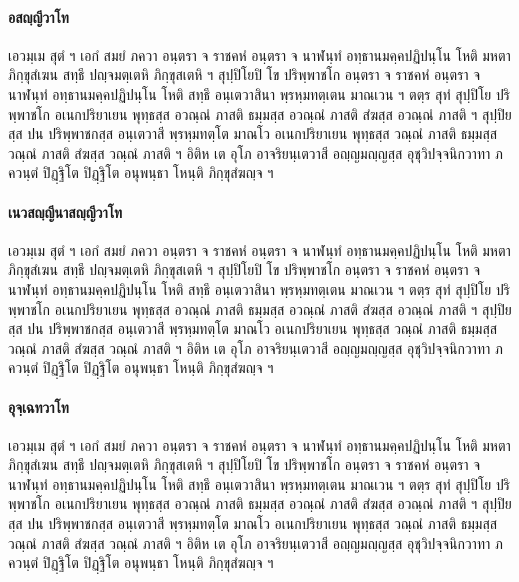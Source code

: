\documentclass[
]{book}
\begin{document}
\hypertarget{uxe2duxe2auxe0duxe3auxe0duxe35uxe27uxe32uxe42uxe17}{%
\paragraph{อสญฺญีวาโท}\label{uxe2duxe2auxe0duxe3auxe0duxe35uxe27uxe32uxe42uxe17}}

เอวมฺเม สุตํ ฯ เอกํ สมยํ ภควา อนฺตรา จ ราชคหํ อนฺตรา จ นาฬนฺทํ อทฺธานมคฺคปฏิปนฺโน โหติ มหตา ภิกฺขุสํเฆน สทฺธึ ปญฺจมตฺเตหิ ภิกฺขุสเตหิ ฯ สุปฺปิโยปิ โข ปริพฺพาชโก อนฺตรา จ ราชคหํ อนฺตรา จ นาฬนฺทํ อทฺธานมคฺคปฏิปนฺโน โหติ สทฺธึ อนฺเตวาสินา พฺรหฺมทตฺเตน มาณเวน ฯ ตตฺร สุทํ สุปฺปิโย ปริพฺพาชโก อเนกปริยาเยน พุทฺธสฺส อวณฺณํ ภาสติ ธมฺมสฺส อวณฺณํ ภาสติ สํฆสฺส อวณฺณํ ภาสติ ฯ สุปฺปิยสฺส ปน ปริพฺพาชกสฺส อนฺเตวาสี พฺรหฺมทตฺโต มาณโว อเนกปริยาเยน พุทฺธสฺส วณฺณํ ภาสติ ธมฺมสฺส วณฺณํ ภาสติ สํฆสฺส วณฺณํ ภาสติ ฯ อิติห เต อุโภ อาจริยนฺเตวาสี อญฺญมญฺญสฺส อุชุวิปจฺจนิกวาทา ภควนฺตํ ปิฏฺฐิโต ปิฏฺฐิโต อนุพนฺธา โหนฺติ ภิกฺขุสํฆญฺจ ฯ

\hypertarget{uxe40uxe19uxe27uxe2auxe0duxe3auxe0duxe35uxe19uxe32uxe2auxe0duxe3auxe0duxe35uxe27uxe32uxe42uxe17}{%
\paragraph{เนวสญฺญีนาสญฺญีวาโท}\label{uxe40uxe19uxe27uxe2auxe0duxe3auxe0duxe35uxe19uxe32uxe2auxe0duxe3auxe0duxe35uxe27uxe32uxe42uxe17}}

เอวมฺเม สุตํ ฯ เอกํ สมยํ ภควา อนฺตรา จ ราชคหํ อนฺตรา จ นาฬนฺทํ อทฺธานมคฺคปฏิปนฺโน โหติ มหตา ภิกฺขุสํเฆน สทฺธึ ปญฺจมตฺเตหิ ภิกฺขุสเตหิ ฯ สุปฺปิโยปิ โข ปริพฺพาชโก อนฺตรา จ ราชคหํ อนฺตรา จ นาฬนฺทํ อทฺธานมคฺคปฏิปนฺโน โหติ สทฺธึ อนฺเตวาสินา พฺรหฺมทตฺเตน มาณเวน ฯ ตตฺร สุทํ สุปฺปิโย ปริพฺพาชโก อเนกปริยาเยน พุทฺธสฺส อวณฺณํ ภาสติ ธมฺมสฺส อวณฺณํ ภาสติ สํฆสฺส อวณฺณํ ภาสติ ฯ สุปฺปิยสฺส ปน ปริพฺพาชกสฺส อนฺเตวาสี พฺรหฺมทตฺโต มาณโว อเนกปริยาเยน พุทฺธสฺส วณฺณํ ภาสติ ธมฺมสฺส วณฺณํ ภาสติ สํฆสฺส วณฺณํ ภาสติ ฯ อิติห เต อุโภ อาจริยนฺเตวาสี อญฺญมญฺญสฺส อุชุวิปจฺจนิกวาทา ภควนฺตํ ปิฏฺฐิโต ปิฏฺฐิโต อนุพนฺธา โหนฺติ ภิกฺขุสํฆญฺจ ฯ

\hypertarget{uxe2duxe38uxe08uxe3auxe40uxe09uxe17uxe27uxe32uxe42uxe17}{%
\paragraph{อุจฺเฉทวาโท}\label{uxe2duxe38uxe08uxe3auxe40uxe09uxe17uxe27uxe32uxe42uxe17}}

เอวมฺเม สุตํ ฯ เอกํ สมยํ ภควา อนฺตรา จ ราชคหํ อนฺตรา จ นาฬนฺทํ อทฺธานมคฺคปฏิปนฺโน โหติ มหตา ภิกฺขุสํเฆน สทฺธึ ปญฺจมตฺเตหิ ภิกฺขุสเตหิ ฯ สุปฺปิโยปิ โข ปริพฺพาชโก อนฺตรา จ ราชคหํ อนฺตรา จ นาฬนฺทํ อทฺธานมคฺคปฏิปนฺโน โหติ สทฺธึ อนฺเตวาสินา พฺรหฺมทตฺเตน มาณเวน ฯ ตตฺร สุทํ สุปฺปิโย ปริพฺพาชโก อเนกปริยาเยน พุทฺธสฺส อวณฺณํ ภาสติ ธมฺมสฺส อวณฺณํ ภาสติ สํฆสฺส อวณฺณํ ภาสติ ฯ สุปฺปิยสฺส ปน ปริพฺพาชกสฺส อนฺเตวาสี พฺรหฺมทตฺโต มาณโว อเนกปริยาเยน พุทฺธสฺส วณฺณํ ภาสติ ธมฺมสฺส วณฺณํ ภาสติ สํฆสฺส วณฺณํ ภาสติ ฯ อิติห เต อุโภ อาจริยนฺเตวาสี อญฺญมญฺญสฺส อุชุวิปจฺจนิกวาทา ภควนฺตํ ปิฏฺฐิโต ปิฏฺฐิโต อนุพนฺธา โหนฺติ ภิกฺขุสํฆญฺจ ฯ
\end{document}

